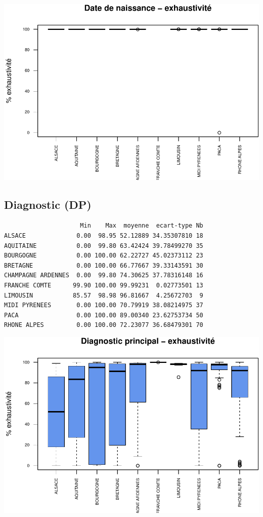 \documentclass[]{article}
\begin{document}
\includegraphics{septembre2015_files/figure-latex/unnamed-chunk-28-1.pdf}

\subsection{Diagnostic (DP)}\label{diagnostic-dp-2}

\begin{verbatim}
                     Min    Max  moyenne  ecart-type Nb
ALSACE              0.00  98.95 52.12889 34.35307810 18
AQUITAINE           0.00  99.80 63.42424 39.78499270 35
BOURGOGNE           0.00 100.00 62.22727 45.02373112 23
BRETAGNE            0.00 100.00 66.77667 39.33143591 30
CHAMPAGNE ARDENNES  0.00  99.80 74.30625 37.78316148 16
FRANCHE COMTE      99.90 100.00 99.99231  0.02773501 13
LIMOUSIN           85.57  98.98 96.81667  4.25672703  9
MIDI PYRENEES       0.00 100.00 70.79919 38.08214975 37
PACA                0.00 100.00 89.00340 23.62753734 50
RHONE ALPES         0.00 100.00 72.23077 36.68479301 70
\end{verbatim}

\includegraphics{septembre2015_files/figure-latex/unnamed-chunk-29-1.pdf}
\end{document}
